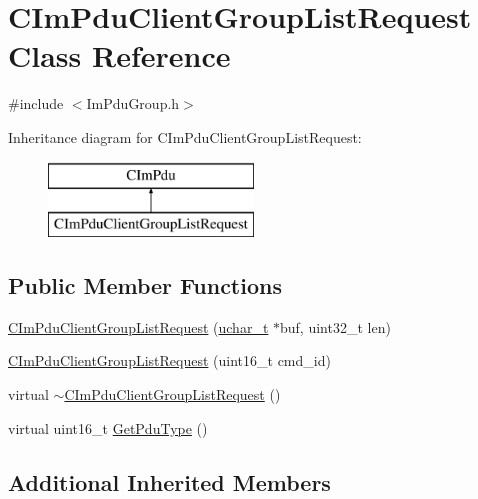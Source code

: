 \hypertarget{class_c_im_pdu_client_group_list_request}{}\section{C\+Im\+Pdu\+Client\+Group\+List\+Request Class Reference}
\label{class_c_im_pdu_client_group_list_request}


{\ttfamily \#include $<$Im\+Pdu\+Group.\+h$>$}

Inheritance diagram for C\+Im\+Pdu\+Client\+Group\+List\+Request\+:\begin{figure}[H]
\begin{center}
\leavevmode
\includegraphics[height=2.000000cm]{class_c_im_pdu_client_group_list_request}
\end{center}
\end{figure}
\subsection*{Public Member Functions}
\begin{DoxyCompactItemize}
\item 
\hyperlink{class_c_im_pdu_client_group_list_request_adb318fdd30f94154e7a07d1647df4f50}{C\+Im\+Pdu\+Client\+Group\+List\+Request} (\hyperlink{base_2ostype_8h_a124ea0f8f4a23a0a286b5582137f0b8d}{uchar\+\_\+t} $\ast$buf, uint32\+\_\+t len)
\item 
\hyperlink{class_c_im_pdu_client_group_list_request_ae5a470e69e24b47345d8f46bc9f135d3}{C\+Im\+Pdu\+Client\+Group\+List\+Request} (uint16\+\_\+t cmd\+\_\+id)
\item 
virtual \hyperlink{class_c_im_pdu_client_group_list_request_a09397592b3ee26537ace12899900cdae}{$\sim$\+C\+Im\+Pdu\+Client\+Group\+List\+Request} ()
\item 
virtual uint16\+\_\+t \hyperlink{class_c_im_pdu_client_group_list_request_a57b3775f669231003db34a835b8b1ad8}{Get\+Pdu\+Type} ()
\end{DoxyCompactItemize}
\subsection*{Additional Inherited Members}


